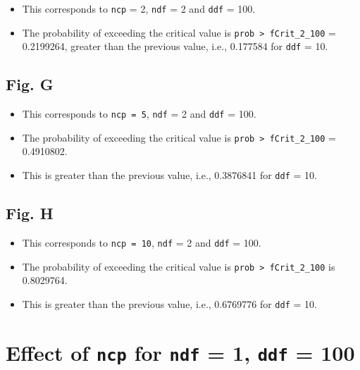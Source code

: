 \documentclass[
]{book}
\providecommand{\tightlist}{%
  \setlength{\itemsep}{0pt}\setlength{\parskip}{0pt}}
\begin{document}
\begin{itemize}
\tightlist
\item
  This corresponds to \texttt{ncp} = 2, \texttt{ndf} = 2 and \texttt{ddf} = 100.
\item
  The probability of exceeding the critical value is \texttt{prob\ \textgreater{}\ fCrit\_2\_100} = 0.2199264, greater than the previous value, i.e., 0.177584 for \texttt{ddf} = 10.
\end{itemize}

\hypertarget{fig.-g}{%
\subsection{Fig. G}\label{fig.-g}}

\begin{itemize}
\tightlist
\item
  This corresponds to \texttt{ncp\ =\ 5}, \texttt{ndf} = 2 and \texttt{ddf} = 100.
\item
  The probability of exceeding the critical value is \texttt{prob\ \textgreater{}\ fCrit\_2\_100} = 0.4910802.
\item
  This is greater than the previous value, i.e., 0.3876841 for \texttt{ddf} = 10.
\end{itemize}

\hypertarget{fig.-h}{%
\subsection{Fig. H}\label{fig.-h}}

\begin{itemize}
\tightlist
\item
  This corresponds to \texttt{ncp\ =\ 10}, \texttt{ndf} = 2 and \texttt{ddf} = 100.
\item
  The probability of exceeding the critical value is \texttt{prob\ \textgreater{}\ fCrit\_2\_100} is 0.8029764.
\item
  This is greater than the previous value, i.e., 0.6769776 for \texttt{ddf} = 10.
\end{itemize}

\hypertarget{effect-of-ncp-for-ndf-1-ddf-100}{%
\section{\texorpdfstring{Effect of \texttt{ncp} for \texttt{ndf} = 1, \texttt{ddf} = 100}{Effect of ncp for ndf = 1, ddf = 100}}\label{effect-of-ncp-for-ndf-1-ddf-100}}
\end{document}
